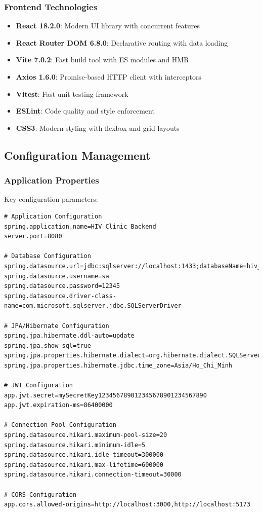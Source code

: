 \documentclass[12pt,a4paper]{article}
\begin{document}
\subsubsection{Frontend Technologies}
\begin{itemize}
    \item \textbf{React 18.2.0}: Modern UI library with concurrent features
    \item \textbf{React Router DOM 6.8.0}: Declarative routing with data loading
    \item \textbf{Vite 7.0.2}: Fast build tool with ES modules and HMR
    \item \textbf{Axios 1.6.0}: Promise-based HTTP client with interceptors
    \item \textbf{Vitest}: Fast unit testing framework
    \item \textbf{ESLint}: Code quality and style enforcement
    \item \textbf{CSS3}: Modern styling with flexbox and grid layouts
\end{itemize}

\subsection{Configuration Management}

\subsubsection{Application Properties}
Key configuration parameters:

\begin{lstlisting}[language=Properties]
# Application Configuration
spring.application.name=HIV Clinic Backend
server.port=8080

# Database Configuration
spring.datasource.url=jdbc:sqlserver://localhost:1433;databaseName=hiv_clinic
spring.datasource.username=sa
spring.datasource.password=12345
spring.datasource.driver-class-name=com.microsoft.sqlserver.jdbc.SQLServerDriver

# JPA/Hibernate Configuration
spring.jpa.hibernate.ddl-auto=update
spring.jpa.show-sql=true
spring.jpa.properties.hibernate.dialect=org.hibernate.dialect.SQLServerDialect
spring.jpa.properties.hibernate.jdbc.time_zone=Asia/Ho_Chi_Minh

# JWT Configuration
app.jwt.secret=mySecretKey123456789012345678901234567890
app.jwt.expiration-ms=86400000

# Connection Pool Configuration
spring.datasource.hikari.maximum-pool-size=20
spring.datasource.hikari.minimum-idle=5
spring.datasource.hikari.idle-timeout=300000
spring.datasource.hikari.max-lifetime=600000
spring.datasource.hikari.connection-timeout=30000

# CORS Configuration
app.cors.allowed-origins=http://localhost:3000,http://localhost:5173
\end{lstlisting}
\end{document}
